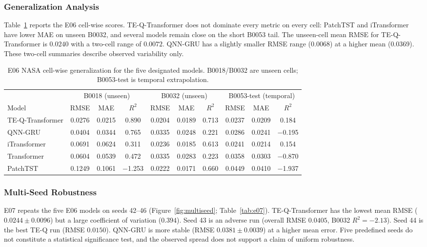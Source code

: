 \subsubsection{Generalization Analysis}
\label{sec:generalization_analysis}

Table~\ref{tab:e06_cells} reports the E06 cell-wise scores. TE-Q-Transformer does not dominate every metric on every cell: PatchTST and iTransformer have lower MAE on unseen B0032, and several models remain close on the short B0053 tail. The unseen-cell mean RMSE for TE-Q-Transformer is $0.0240$ with a two-cell range of $0.0072$. QNN-GRU has a slightly smaller RMSE range ($0.0068$) at a higher mean ($0.0369$). These two-cell summaries describe observed variability only.

\begin{table}[t]
\centering
\caption{E06 NASA cell-wise generalization for the five designated models. B0018/B0032 are unseen cells; B0053-test is temporal extrapolation.}\label{tab:e06_cells}
\footnotesize
\begin{tabular}{@{}lccccccccc@{}}
\toprule
 & \multicolumn{3}{c}{B0018 (unseen)} & \multicolumn{3}{c}{B0032 (unseen)} & \multicolumn{3}{c}{B0053-test (temporal)} \\
\cmidrule(lr){2-4}\cmidrule(lr){5-7}\cmidrule(lr){8-10}
Model & RMSE & MAE & $R^2$ & RMSE & MAE & $R^2$ & RMSE & MAE & $R^2$ \\
\midrule
TE-Q-Transformer & 0.0276 & 0.0215 & 0.890 & 0.0204 & 0.0189 & 0.713 & 0.0237 & 0.0209 & 0.184 \\
QNN-GRU & 0.0404 & 0.0344 & 0.765 & 0.0335 & 0.0248 & 0.221 & 0.0286 & 0.0241 & $-$0.195 \\
iTransformer & 0.0691 & 0.0624 & 0.311 & 0.0236 & 0.0185 & 0.613 & 0.0241 & 0.0214 & 0.154 \\
Transformer & 0.0604 & 0.0539 & 0.472 & 0.0335 & 0.0283 & 0.223 & 0.0358 & 0.0303 & $-$0.870 \\
PatchTST & 0.1249 & 0.1061 & $-$1.253 & 0.0222 & 0.0171 & 0.660 & 0.0449 & 0.0410 & $-$1.937 \\
\bottomrule
\end{tabular}
\end{table}

\subsubsection{Multi-Seed Robustness}
\label{sec:multiseed_analysis}

E07 repeats the five E06 models on seeds 42--46 (Figure~\ref{fig:multiseed}; Table~\ref{tab:e07}). TE-Q-Transformer has the lowest mean RMSE ($0.0244\pm0.0096$) but a large coefficient of variation ($0.394$). Seed 43 is an adverse run (overall RMSE $0.0405$, B0032 $R^2=-2.13$). Seed 44 is the best TE-Q run (RMSE $0.0150$). QNN-GRU is more stable (RMSE $0.0381\pm0.0039$) at a higher mean error. Five predefined seeds do not constitute a statistical significance test, and the observed spread does not support a claim of uniform robustness.

